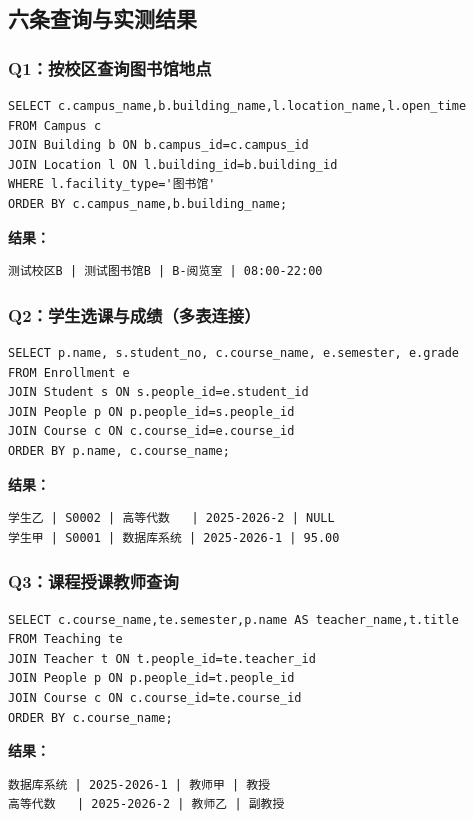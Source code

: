 \documentclass[11pt, a4paper]{article}
\begin{document}
\subsection{六条查询与实测结果}

\subsubsection*{Q1：按校区查询图书馆地点}
\begin{verbatim}
SELECT c.campus_name,b.building_name,l.location_name,l.open_time
FROM Campus c
JOIN Building b ON b.campus_id=c.campus_id
JOIN Location l ON l.building_id=b.building_id
WHERE l.facility_type='图书馆'
ORDER BY c.campus_name,b.building_name;
\end{verbatim}
\textbf{结果：}
\begin{verbatim}
测试校区B | 测试图书馆B | B-阅览室 | 08:00-22:00
\end{verbatim}

\subsubsection*{Q2：学生选课与成绩（多表连接）}
\begin{verbatim}
SELECT p.name, s.student_no, c.course_name, e.semester, e.grade
FROM Enrollment e
JOIN Student s ON s.people_id=e.student_id
JOIN People p ON p.people_id=s.people_id
JOIN Course c ON c.course_id=e.course_id
ORDER BY p.name, c.course_name;
\end{verbatim}
\textbf{结果：}
\begin{verbatim}
学生乙 | S0002 | 高等代数   | 2025-2026-2 | NULL
学生甲 | S0001 | 数据库系统 | 2025-2026-1 | 95.00
\end{verbatim}

\subsubsection*{Q3：课程授课教师查询}
\begin{verbatim}
SELECT c.course_name,te.semester,p.name AS teacher_name,t.title
FROM Teaching te
JOIN Teacher t ON t.people_id=te.teacher_id
JOIN People p ON p.people_id=t.people_id
JOIN Course c ON c.course_id=te.course_id
ORDER BY c.course_name;
\end{verbatim}
\textbf{结果：}
\begin{verbatim}
数据库系统 | 2025-2026-1 | 教师甲 | 教授
高等代数   | 2025-2026-2 | 教师乙 | 副教授
\end{verbatim}
\end{document}
